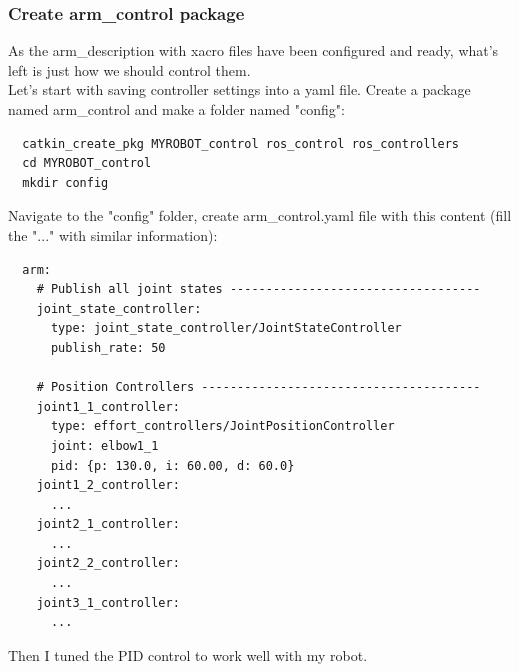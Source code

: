 \documentclass[pdftex,12pt,a4paper]{article}
\begin{document}
  \subsubsection{Create arm\_control package}
  As the arm\_description with xacro files have been configured and ready, what's left is just how we should control them.\\
  Let's start with saving controller settings into a yaml file. Create a package named arm\_control and make a folder named "config":
  \begin{lstlisting}
  catkin_create_pkg MYROBOT_control ros_control ros_controllers
  cd MYROBOT_control
  mkdir config
  \end{lstlisting}
  Navigate to the "config" folder, create arm\_control.yaml file with this content (fill the "..." with similar information):
  \begin{lstlisting}
  arm:
    # Publish all joint states -----------------------------------
    joint_state_controller:
      type: joint_state_controller/JointStateController
      publish_rate: 50
      
    # Position Controllers ---------------------------------------
    joint1_1_controller:
      type: effort_controllers/JointPositionController
      joint: elbow1_1
      pid: {p: 130.0, i: 60.00, d: 60.0}
    joint1_2_controller:
      ...
    joint2_1_controller:
      ...
    joint2_2_controller:
      ...
    joint3_1_controller:
      ...
  \end{lstlisting}
  Then I tuned the PID control to work well with my robot.
  
\end{document}
